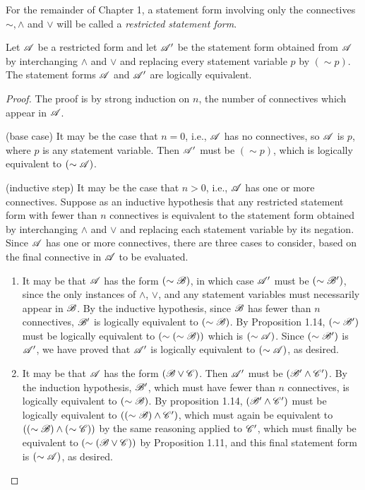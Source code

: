 For the remainder of Chapter 1, a statement form involving only the connectives \(\sim, \land\) and \(\lor\) will be called a \textit{restricted statement form}.

\begin{proposition}
  Let \(\mathscr{A}\) be a restricted form and let \(\mathscr{A}'\) be the statement form obtained from \(\mathscr{A}\) by interchanging \(\land\) and \(\lor\) and replacing every statement variable \(p\) by \((\sim p)\). The statement forms \(\mathscr{A}\) and \(\mathscr{A}'\) are logically equivalent.

  \begin{proof}
    The proof is by strong induction on \(n\), the number of connectives which appear in \(\mathscr{A}\).

    (base case) It may be the case that \(n = 0\), i.e., \(\mathscr{A}\) has no connectives, so \(\mathscr{A}\) is \(p\), where \(p\) is any statement variable. Then \(\mathscr{A}'\) must be \((\sim p)\), which is logically equivalent to \((\sim\mathscr{A})\).

    (inductive step) It may be the case that \(n > 0\), i.e., \(\mathscr{A}\) has one or more connectives. Suppose as an inductive hypothesis that any restricted statement form with fewer than \(n\) connectives is equivalent to the statement form obtained by interchanging \(\land\) and \(\lor\) and replacing each statement variable by its negation. Since \(\mathscr{A}\) has one or more connectives, there are three cases to consider, based on the final connective in \(\mathscr{A}\) to be evaluated.

    \begin{enumerate}
      \item It may be that \(\mathscr{A}\) has the form \((\sim\mathscr{B})\), in which case \(\mathscr{A}'\) must be \((\sim\mathscr{B}')\), since the only instances of \(\land\), \(\lor\), and any statement variables must necessarily appear in \(\mathscr{B}\). By the inductive hypothesis, since \(\mathscr{B}\) has fewer than \(n\) connectives, \(\mathscr{B}'\) is logically equivalent to \((\sim\mathscr{B})\). By Proposition 1.14, \((\sim\mathscr{B}')\) must be logically equivalent to \((\sim(\sim\mathscr{B}))\) which is \((\sim\mathscr{A})\). Since \((\sim\mathscr{B}')\) is \(\mathscr{A}'\), we have proved that \(\mathscr{A}'\) is logically equivalent to \((\sim\mathscr{A})\), as desired.

      \item It may be that \(\mathscr{A}\) has the form \((\mathscr{B} \lor \mathscr{C})\). Then \(\mathscr{A}'\) must be \((\mathscr{B}' \land \mathscr{C}')\). By the induction hypothesis, \(\mathscr{B}'\), which must have fewer than \(n\) connectives, is logically equivalent to \((\sim\mathscr{B})\). By proposition 1.14, \((\mathscr{B}' \land \mathscr{C}')\) must be logically equivalent to \(((\sim\mathscr{B}) \land \mathscr{C}')\), which must again be equivalent to \(((\sim\mathscr{B}) \land (\sim\mathscr{C}))\) by the same reasoning applied to \(\mathscr{C}'\), which must finally be equivalent to \((\sim(\mathscr{B} \lor \mathscr{C}))\) by Proposition 1.11, and this final statement form is \((\sim\mathscr{A})\), as desired.


\end{enumerate}
\end{proof}
\end{proposition}
